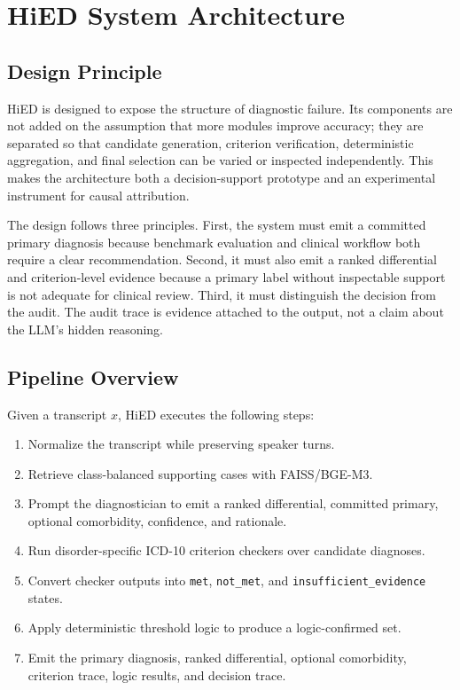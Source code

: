 \chapter{HiED System Architecture}
\label{ch:architecture}

\section{Design Principle}

HiED is designed to expose the structure of diagnostic failure. Its components are not added on the assumption that more modules improve accuracy; they are separated so that candidate generation, criterion verification, deterministic aggregation, and final selection can be varied or inspected independently. This makes the architecture both a decision-support prototype and an experimental instrument for causal attribution.

The design follows three principles. First, the system must emit a committed primary diagnosis because benchmark evaluation and clinical workflow both require a clear recommendation. Second, it must also emit a ranked differential and criterion-level evidence because a primary label without inspectable support is not adequate for clinical review. Third, it must distinguish the decision from the audit. The audit trace is evidence attached to the output, not a claim about the LLM's hidden reasoning.

\section{Pipeline Overview}


Given a transcript $x$, HiED executes the following steps:

\begin{enumerate}[label=\arabic*.]
\item Normalize the transcript while preserving speaker turns.
\item Retrieve class-balanced supporting cases with FAISS/BGE-M3.
\item Prompt the diagnostician to emit a ranked differential, committed primary, optional comorbidity, confidence, and rationale.
\item Run disorder-specific ICD-10 criterion checkers over candidate diagnoses.
\item Convert checker outputs into \texttt{met}, \texttt{not\_met}, and \texttt{insufficient\_evidence} states.
\item Apply deterministic threshold logic to produce a logic-confirmed set.
\item Emit the primary diagnosis, ranked differential, optional comorbidity, criterion trace, logic results, and decision trace.
\end{enumerate}

